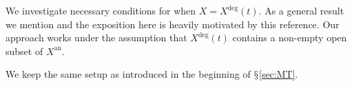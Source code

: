 \documentclass[12pt,oneside]{amsart}
\begin{document}

We investigate necessary conditions for when $X=X^{\mathrm{deg}}(t)$.
As a general result we mention \cite[Theorem~8.1]{GaoBettiRank} and
the exposition here is heavily motivated by this reference. Our
approach works under the assumption that $X^{\mathrm{deg}}(t)$ contains a
non-empty open subset of $X^{\mathrm{an}}$.

We keep the same setup as introduced in the beginning of $\mathsection$\ref{sec:MT}.
\end{document}
